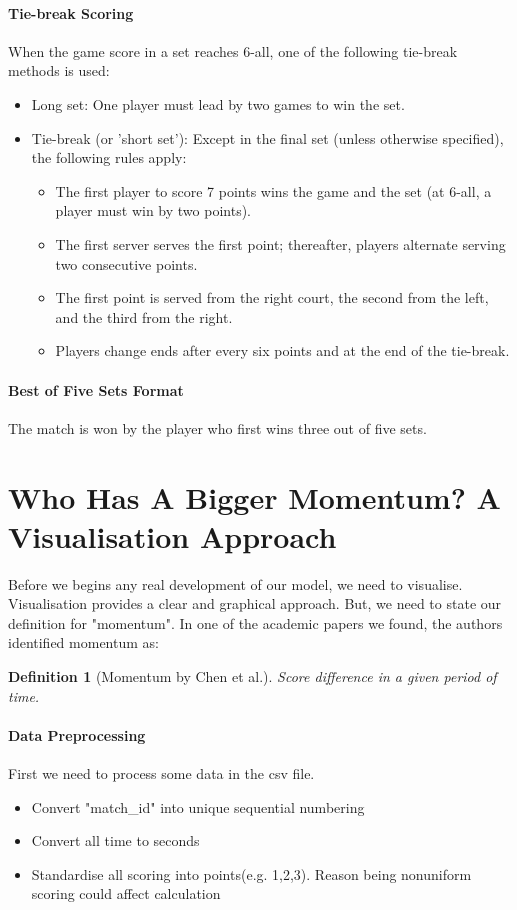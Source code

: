 \documentclass[UTF8]{mcmthesis}
\newtheorem{definition}[theorem]{Definition}
\begin{document}
	\paragraph{Tie-break Scoring}
	When the game score in a set reaches 6-all, one of the following tie-break methods is used:
	\begin{itemize}
		\item Long set: One player must lead by two games to win the set.
		\item Tie-break (or 'short set'): Except in the final set (unless otherwise specified), the following rules apply:
		\begin{itemize}
			\item The first player to score 7 points wins the game and the set (at 6-all, a player must win by two points).
			\item The first server serves the first point; thereafter, players alternate serving two consecutive points.
			\item The first point is served from the right court, the second from the left, and the third from the right.
			\item Players change ends after every six points and at the end of the tie-break.
		\end{itemize}
	\end{itemize}
		
	\paragraph{Best of Five Sets Format}
	The match is won by the player who first wins three out of five sets.

   \section{Who Has A Bigger Momentum? A Visualisation Approach}
	Before we begins any real development of our model, we need to visualise. Visualisation provides a clear and graphical approach. But, we need to state our definition for "momentum". In one of the academic papers we found, the authors \cite{chen-2020} identified momentum as:
	\begin{definition}[Momentum by Chen et al.]
		Score difference in a given period of time.
	\end{definition}
	\paragraph{Data Preprocessing}
	First we need to process some data in the csv file.
	\begin{itemize}
		\item Convert "match\_id" into unique sequential numbering
		\item Convert all time to seconds
		\item Standardise all scoring into points(e.g. 1,2,3). Reason being nonuniform scoring could affect calculation
	\end{itemize}
	
\end{document}
